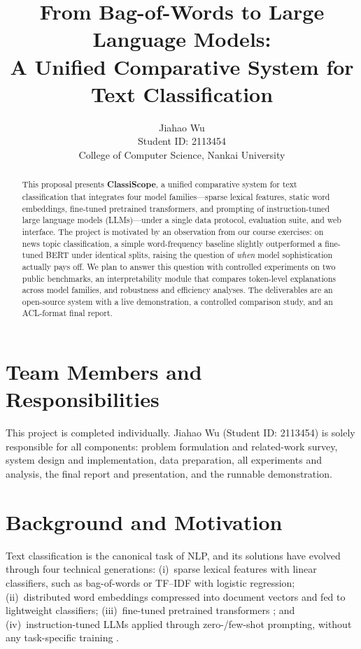 \documentclass[11pt]{article}
\title{From Bag-of-Words to Large Language Models:\\ A Unified Comparative System for Text Classification}
\author{Jiahao Wu \\
  Student ID: 2113454 \\
  College of Computer Science, Nankai University \\}
\begin{document}
\maketitle

\begin{abstract}
This proposal presents \textbf{ClassiScope}, a unified comparative system for text classification that integrates four model families---sparse lexical features, static word embeddings, fine-tuned pretrained transformers, and prompting of instruction-tuned large language models (LLMs)---under a single data protocol, evaluation suite, and web interface. The project is motivated by an observation from our course exercises: on news topic classification, a simple word-frequency baseline slightly outperformed a fine-tuned BERT under identical splits, raising the question of \emph{when} model sophistication actually pays off. We plan to answer this question with controlled experiments on two public benchmarks, an interpretability module that compares token-level explanations across model families, and robustness and efficiency analyses. The deliverables are an open-source system with a live demonstration, a controlled comparison study, and an ACL-format final report.
\end{abstract}

\section{Team Members and Responsibilities}

This project is completed individually. Jiahao Wu (Student ID: 2113454) is solely responsible for all components: problem formulation and related-work survey, system design and implementation, data preparation, all experiments and analysis, the final report and presentation, and the runnable demonstration.

\section{Background and Motivation}

Text classification is the canonical task of NLP, and its solutions have evolved through four technical generations: (i)~sparse lexical features with linear classifiers, such as bag-of-words or TF--IDF with logistic regression; (ii)~distributed word embeddings \citep{mikolov2013efficient,pennington2014glove} compressed into document vectors and fed to lightweight classifiers; (iii)~fine-tuned pretrained transformers \citep{vaswani2017attention,devlin-etal-2019-bert}; and (iv)~instruction-tuned LLMs applied through zero-/few-shot prompting, without any task-specific training \citep{brown2020language,ouyang2022training,qwen2025}.
\end{document}
